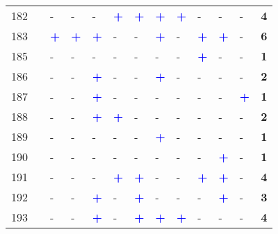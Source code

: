 \begin{longtable}{p{0.5cm}p{4.6cm}p{0.3cm}p{0.3cm}p{0.3cm}p{0.3cm}p{0.3cm}p{0.3cm}p{0.3cm}p{0.3cm}p{0.3cm}p{0.3cm}p{1cm}}
    \small{182} & \small{\textcite{sherwin_practices_2011}}\index{Sherwin, Henrietta|pagebf} & - & - & - & \textcolor{blue}{\textbf{+}} & \textcolor{blue}{\textbf{+}} & \textcolor{blue}{\textbf{+}} & \textcolor{blue}{\textbf{+}} & - & - & - & \textbf{4}\\
    \small{183} & \small{\textcite{singleton_exploring_2014}}\index{Singleton, Patrick A.|pagebf} & \textcolor{blue}{\textbf{+}} & \textcolor{blue}{\textbf{+}} & \textcolor{blue}{\textbf{+}} & - & - & \textcolor{blue}{\textbf{+}} & - & \textcolor{blue}{\textbf{+}} & \textcolor{blue}{\textbf{+}} & - & \textbf{6}\\
    \small{185} & \small{\textcite{song_investigating_2020}}\index{Song, Ying|pagebf} & - & - & - & - & - & - & - & \textcolor{blue}{\textbf{+}} & - & - & \textbf{1}\\
    \small{186} & \small{\textcite{staricco_implementing_2020}}\index{Staricco, Luca|pagebf} & - & - & \textcolor{blue}{\textbf{+}} & - & - & \textcolor{blue}{\textbf{+}} & - & - & - & - & \textbf{2}\\
    \small{187} & \small{\textcite{stransky_quartiers_2017}}\index{Stransky, Václav|pagebf} & - & - & \textcolor{blue}{\textbf{+}} & - & - & - & - & - & - & \textcolor{blue}{\textbf{+}} & \textbf{1}\\
    \small{188} & \small{\textcite{stransky_periurbain_2019}}\index{Stransky, Václav|pagebf} & - & - & \textcolor{blue}{\textbf{+}} & \textcolor{blue}{\textbf{+}} & - & - & - & - & - & - & \textbf{2}\\
    \small{189} & \small{\textcite{tamakloe_determinants_2021}}\index{Tamakloe, Reuben|pagebf} & - & - & - & - & - & \textcolor{blue}{\textbf{+}} & - & - & - & - & \textbf{1}\\
    \small{190} & \small{\textcite{tang_uncovering_2021}}\index{Tang, Jinjun|pagebf} & - & - & - & - & - & - & - & - & \textcolor{blue}{\textbf{+}} & - & \textbf{1}\\
    \small{191} & \small{\textcite{tarpin-pitre_typology_2020}}\index{Tarpin-Pitre, Léandre|pagebf} & - & - & - & \textcolor{blue}{\textbf{+}} & \textcolor{blue}{\textbf{+}} & - & - & \textcolor{blue}{\textbf{+}} & \textcolor{blue}{\textbf{+}} & - & \textbf{4}\\
    \small{192} & \small{\textcite{taylor_analysis_1996}}\index{Taylor, Dean|pagebf} & - & - & \textcolor{blue}{\textbf{+}} & - & \textcolor{blue}{\textbf{+}} & - & - & - & \textcolor{blue}{\textbf{+}} & - & \textbf{3}\\
    \small{193} & \small{\textcite{tomita_demand_2017}}\index{Tomita, Yasuo|pagebf}\index{Tomita, Yasuo|pagebf} & - & - & \textcolor{blue}{\textbf{+}} & - & \textcolor{blue}{\textbf{+}} & \textcolor{blue}{\textbf{+}} & \textcolor{blue}{\textbf{+}} & - & - & - & \textbf{4}\\

\end{longtable}
